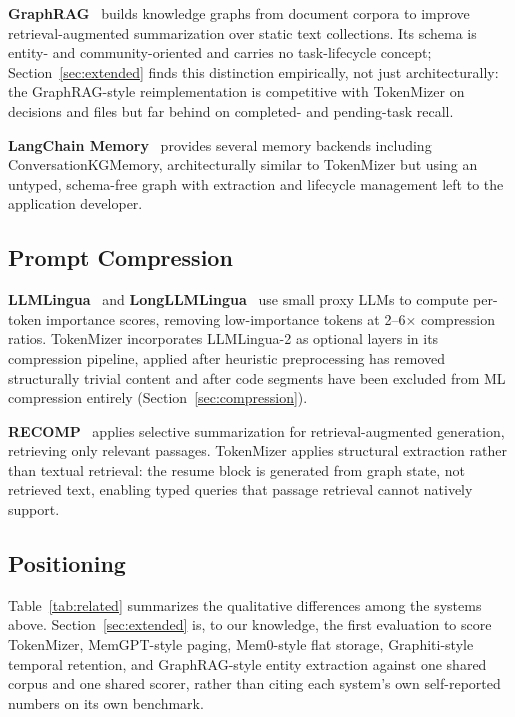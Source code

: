 \documentclass[journal]{IEEEtran}
\begin{document}
\textbf{GraphRAG}~\cite{graphrag} builds knowledge graphs from
document corpora to improve retrieval-augmented summarization
over static text collections.
Its schema is entity- and community-oriented and carries no
task-lifecycle concept; Section~\ref{sec:extended} finds this
distinction empirically, not just architecturally: the
GraphRAG-style reimplementation is competitive with TokenMizer
on decisions and files but far behind on completed- and
pending-task recall.

\textbf{LangChain Memory}~\cite{langchain} provides several
memory backends including ConversationKGMemory, architecturally
similar to TokenMizer but using an untyped, schema-free graph
with extraction and lifecycle management left to the
application developer.

\subsection{Prompt Compression}

\textbf{LLMLingua}~\cite{llmlingua} and
\textbf{LongLLMLingua}~\cite{longllmlingua} use small proxy
LLMs to compute per-token importance scores, removing
low-importance tokens at 2--6$\times$ compression ratios.
TokenMizer incorporates LLMLingua-2 as optional layers in its
compression pipeline, applied after heuristic preprocessing
has removed structurally trivial content and after code
segments have been excluded from ML compression entirely
(Section~\ref{sec:compression}).

\textbf{RECOMP}~\cite{recomp} applies selective summarization
for retrieval-augmented generation, retrieving only relevant
passages.
TokenMizer applies structural extraction rather than textual
retrieval: the resume block is generated from graph state, not
retrieved text, enabling typed queries that passage retrieval
cannot natively support.

\subsection{Positioning}

Table~\ref{tab:related} summarizes the qualitative differences
among the systems above.
Section~\ref{sec:extended} is, to our knowledge, the first
evaluation to score TokenMizer, MemGPT-style paging, Mem0-style
flat storage, Graphiti-style temporal retention, and
GraphRAG-style entity extraction against one shared corpus and
one shared scorer, rather than citing each system's own
self-reported numbers on its own benchmark.
\end{document}
